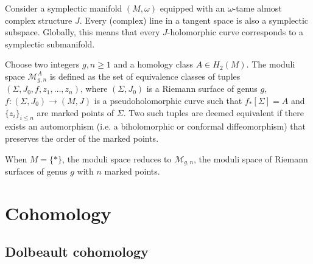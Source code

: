     \begin{property}
        Consider a symplectic manifold $(M,\omega)$ equipped with an $\omega$-tame almost complex structure $J$. Every (complex) line in a tangent space is also a symplectic subspace. Globally, this means that every $J$-holomorphic curve corresponds to a symplectic submanifold.
    \end{property}


    \begin{construct}
        Choose two integers $g,n\geq1$ and a homology class $A\in H_2(M)$. The moduli space $\mathcal{M}^A_{g,n}$ is defined as the set of equivalence classes of tuples $(\Sigma,J_0,f,z_1,\ldots,z_n)$, where $(\Sigma,J_0)$ is a Riemann surface of genus $g$, $f:(\Sigma,J_0)\rightarrow(M,J)$ is a pseudoholomorphic curve such that $f_*[\Sigma]=A$ and $\{z_i\}_{i\leq n}$ are marked points of $\Sigma$. Two such tuples are deemed equivalent if there exists an automorphism (i.e. a biholomorphic or conformal diffeomorphism) that preserves the order of the marked points.
    \end{construct}
    \begin{example}
        When $M=\{\ast\}$, the moduli space reduces to $\mathcal{M}_{g,n}$, the moduli space of Riemann surfaces of genus $g$ with $n$ marked points.
    \end{example}

\section{Cohomology}
\subsection{Dolbeault cohomology}

